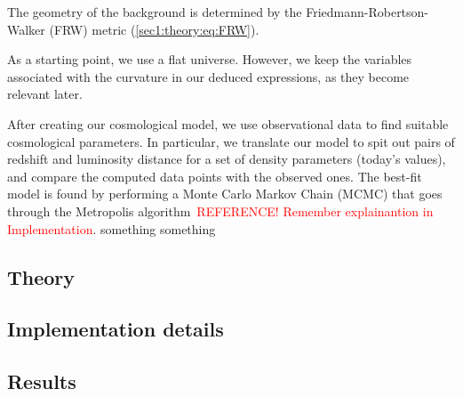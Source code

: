 

The geometry of the background is determined by the Friedmann-Robertson-Walker (FRW) metric (\cref{sec1:theory:eq:FRW}).


As a starting point, we use a flat universe. However, we keep the variables associated with the curvature in our deduced expressions, as they become relevant later. 

After creating our cosmological model, we use observational data \citep{2014A&A...568A..22B} to find suitable cosmological parameters. In particular, we translate our model to spit out pairs of redshift and luminosity distance for a set of density parameters (today's values), and compare the computed data points with the observed ones. The best-fit model is found by performing a Monte Carlo Markov Chain (MCMC) that goes through the Metropolis algorithm \textcolor{red}{REFERENCE! Remember explainantion in Implementation}. 
%
something something \citep{2006astro.ph..6683C}



\subsection{Theory}


\subsection{Implementation details}


\subsection{Results}

